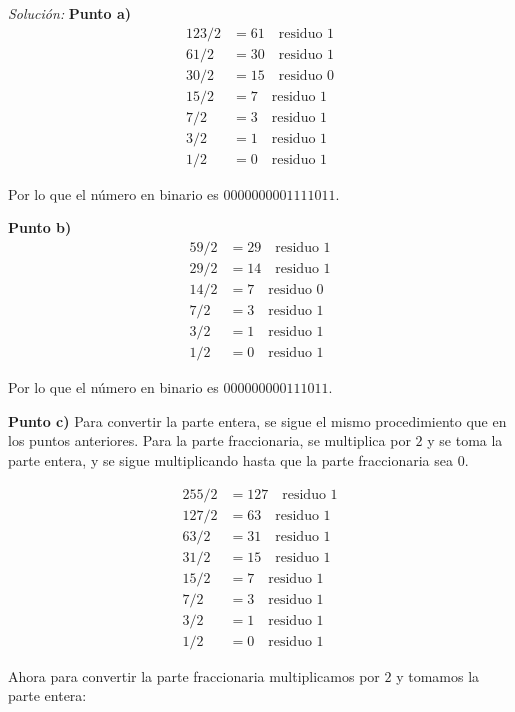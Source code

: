 \documentclass{article}
\newenvironment{solution}
    {\textit{Solución:}}
    {}
\begin{document}
\begin{solution}
\textbf{Punto a)}
\begin{align*}
    123/2 &= 61 \quad \text{residuo } 1\\
    61/2 &= 30 \quad \text{residuo } 1\\
    30/2 &= 15 \quad \text{residuo } 0\\
    15/2 &= 7 \quad \text{residuo } 1\\
    7/2 &= 3 \quad \text{residuo } 1\\
    3/2 &= 1 \quad \text{residuo } 1\\
    1/2 &= 0 \quad \text{residuo } 1
\end{align*}

Por lo que el número en binario es $0000000001111011$.

\textbf{Punto b)}
\begin{align*}
    59/2 &= 29 \quad \text{residuo } 1\\
    29/2 &= 14 \quad \text{residuo } 1\\
    14/2 &= 7 \quad \text{residuo } 0\\
    7/2 &= 3 \quad \text{residuo } 1\\
    3/2 &= 1 \quad \text{residuo } 1\\
    1/2 &= 0 \quad \text{residuo } 1
\end{align*}

Por lo que el número en binario es $000000000111011$.

\newpage
\textbf{Punto c)}
Para convertir la parte entera, se sigue el mismo procedimiento que en los puntos anteriores. Para la parte fraccionaria, se multiplica por $2$ y se toma la parte entera, y se sigue multiplicando hasta que la parte fraccionaria sea $0$.

\begin{align*}
    255/2 &= 127 \quad \text{residuo } 1\\
    127/2 &= 63 \quad \text{residuo } 1\\
    63/2 &= 31 \quad \text{residuo } 1\\
    31/2 &= 15 \quad \text{residuo } 1\\
    15/2 &= 7 \quad \text{residuo } 1\\
    7/2 &= 3 \quad \text{residuo } 1\\
    3/2 &= 1 \quad \text{residuo } 1\\
    1/2 &= 0 \quad \text{residuo } 1
\end{align*}

Ahora para convertir la parte fraccionaria multiplicamos por $2$ y tomamos la parte entera:


\end{solution}
\end{document}
